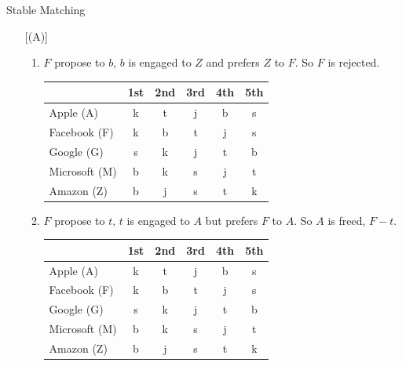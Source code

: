 \documentclass{article}
\numberwithin{table}{section}
\numberwithin{figure}{section}
\begin{document}
\begin{section}{Stable Matching}
\begin{enumerate} [(A)]
\begin{enumerate}[(1)]
\begin{tcolorbox}[breakable]
\begin{enumerate}[(1)]
                    \item $F$ propose to $b$, $b$ is engaged to $Z$ and prefers $Z$ to $F$. So $F$ is rejected.
                    \begin{table}[H]
                        \centering
                        \begin{tabular}{|m{2.5cm}|*{5}{c|}}
                            \hline
                            & 1st & 2nd & 3rd & 4th & 5th \\
                            \hline
                            Apple (A)        & {\color{blue} k} & {\color{red} t} & j & b & s \\
                            Facebook (F)     & {\color{blue} k} & {\color{blue} b} & t & j & s \\
                            Google (G)       & {\color{red} s} & k & j & t & b \\
                            Microsoft (M)    & {\color{blue} b} & {\color{red} k} & s & j & t \\
                            Amazon (Z)       & {\color{red} b} & j & s & t & k \\
                            \hline                            
                        \end{tabular}
                    \end{table}        

                    \item $F$ propose to $t$, $t$ is engaged to $A$ but prefers $F$ to $A$. So $A$ is freed, $F-t$.
                    \begin{table}[H]
                        \centering
                        \begin{tabular}{|m{2.5cm}|*{5}{c|}}
                            \hline
                            & 1st & 2nd & 3rd & 4th & 5th \\
                            \hline
                            Apple (A)        & {\color{blue} k} & {\color{blue} t} & j & b & s \\
                            Facebook (F)     & {\color{blue} k} & {\color{blue} b} & {\color{red} t} & j & s \\
                            Google (G)       & {\color{red} s} & k & j & t & b \\
                            Microsoft (M)    & {\color{blue} b} & {\color{red} k} & s & j & t \\
                            Amazon (Z)       & {\color{red} b} & j & s & t & k \\
                            \hline                            
                        \end{tabular}
                    \end{table}                    


\end{enumerate}
\end{tcolorbox}
\end{enumerate}
\end{enumerate}
\end{section}
\end{document}
